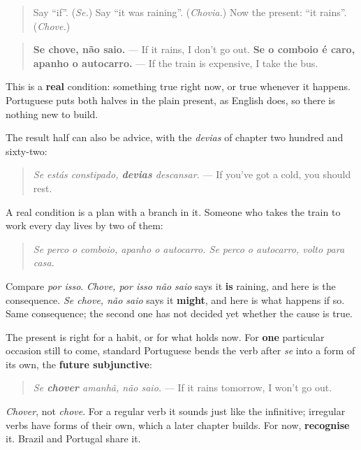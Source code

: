 \label{lesson:PT-C267-se-chove}



\begin{quote}
Say \textquotedblleft{}if\textquotedblright{}. (\emph{Se.}) Say \textquotedblleft{}it was raining\textquotedblright{}. (\emph{Chovia.}) Now the present: \textquotedblleft{}it rains\textquotedblright{}. (\emph{Chove.})
\end{quote}

\begin{grammarlens}[title={Grammar Lens: both halves in the present}]
\begin{quote}
\textbf{Se chove, não saio.} — If it rains, I don't go out. \textbf{Se o comboio é caro, apanho o autocarro.} — If the train is expensive, I take the bus.
\end{quote}

This is a \textbf{real} condition: something true right now, or true whenever it happens. Portuguese puts both halves in the plain present, as English does, so there is nothing new to build.

The result half can also be advice, with the \emph{devias} of chapter two hundred and sixty-two:

\begin{quote}
\emph{Se estás constipado, \textbf{devias} descansar.} — If you've got a cold, you should rest.
\end{quote}
\end{grammarlens}

\begin{culture}
A real condition is a plan with a branch in it. Someone who takes the train to work every day lives by two of them:

\begin{quote}
\emph{Se perco o comboio, apanho o autocarro. Se perco o autocarro, volto para casa.}
\end{quote}

Compare \emph{por isso}. \emph{Chove, por isso não saio} says it \textbf{is} raining, and here is the consequence. \emph{Se chove, não saio} says it \textbf{might}, and here is what happens if so. Same consequence; the second one has not decided yet whether the cause is true.
\end{culture}

\begin{grammarlens}[title={Grammar Lens: one occasion still to come}]
The present is right for a habit, or for what holds now. For \textbf{one} particular occasion still to come, standard Portuguese bends the verb after \emph{se} into a form of its own, the \textbf{future subjunctive}:

\begin{quote}
\emph{Se \textbf{chover} amanhã, não saio.} — If it rains tomorrow, I won't go out.
\end{quote}

\emph{Chover}, not \emph{chove}. For a regular verb it sounds just like the infinitive; irregular verbs have forms of their own, which a later chapter builds. For now, \textbf{recognise} it. Brazil and Portugal share it.
\end{grammarlens}

